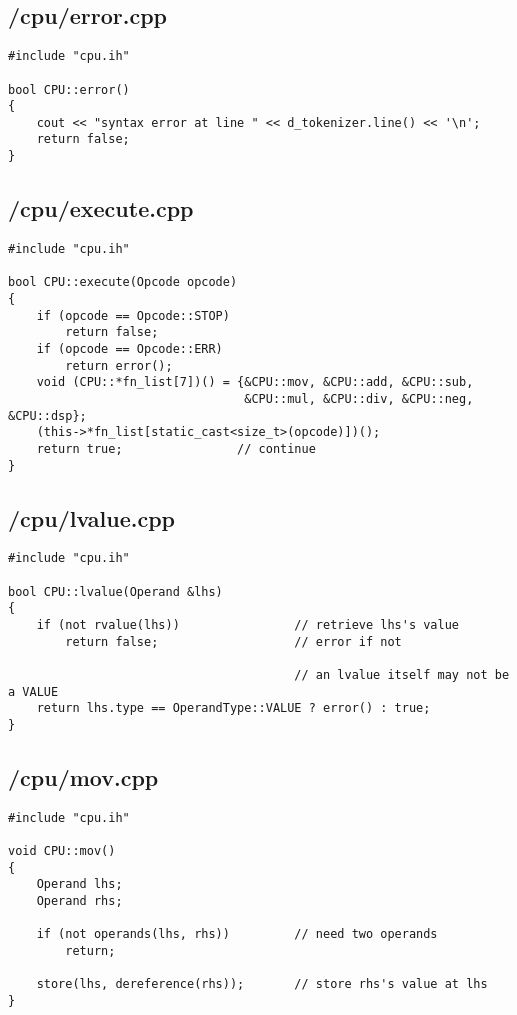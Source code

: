 \documentclass{article}
\begin{document}
\subsection*{/cpu/error.cpp}
\begin{verbatim}
#include "cpu.ih"

bool CPU::error()
{
    cout << "syntax error at line " << d_tokenizer.line() << '\n';
    return false;
}
\end{verbatim}
\subsection*{/cpu/execute.cpp}
\begin{verbatim}
#include "cpu.ih"

bool CPU::execute(Opcode opcode)
{
    if (opcode == Opcode::STOP)
        return false;
    if (opcode == Opcode::ERR)
        return error();
    void (CPU::*fn_list[7])() = {&CPU::mov, &CPU::add, &CPU::sub, 
                                 &CPU::mul, &CPU::div, &CPU::neg, &CPU::dsp};
    (this->*fn_list[static_cast<size_t>(opcode)])();
    return true;                // continue
}
\end{verbatim}
\subsection*{/cpu/lvalue.cpp}
\begin{verbatim}
#include "cpu.ih"

bool CPU::lvalue(Operand &lhs)
{
    if (not rvalue(lhs))                // retrieve lhs's value
        return false;                   // error if not

                                        // an lvalue itself may not be a VALUE
    return lhs.type == OperandType::VALUE ? error() : true;
}   
\end{verbatim}
\subsection*{/cpu/mov.cpp}
\begin{verbatim}
#include "cpu.ih"

void CPU::mov()
{
    Operand lhs;
    Operand rhs;

    if (not operands(lhs, rhs))         // need two operands
        return;

    store(lhs, dereference(rhs));       // store rhs's value at lhs
}


\end{verbatim}
\end{document}
